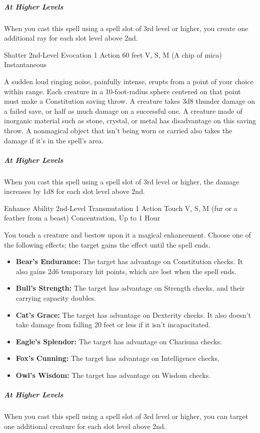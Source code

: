 {\subparagraph*{At Higher Levels} When you cast this spell using a spell slot of 3rd level or higher, you create one additional ray for each slot level above 2nd.

\DndSpellHeader
  {Shatter}
  {2nd-Level Evocation}
  {1 Action}
  {60 feet}
  {V, S, M (A chip of mica)}
  {Instantaneous}
  
A sudden loud ringing noise, painfully intense, erupts from a point of your choice within range. Each creature in a 10-foot-radius sphere centered on that point must make a Constitution saving throw. A creature takes 3d8 thunder damage on a failed save, or half as much damage on a successful one. A creature made of inorganic material such as stone, crystal, or metal has disadvantage on this saving throw. A nonmagical object that isn’t being worn or carried also takes the damage if it’s in the spell’s area.

\subparagraph*{At Higher Levels} When you cast this spell using a spell slot of 3rd level or higher, the damage increases by 1d8 for each slot level above 2nd.

\DndSpellHeader
  {Enhance Ability}
  {2nd-Level Transmutation}
  {1 Action}
  {Touch}
  {V, S, M (fur or a feather from a beast)}
  {Concentration, Up to 1 Hour}
  
You touch a creature and bestow upon it a magical enhancement. Choose one of the following effects; the target gains the effect until the spell ends.
\begin{itemize}
	\item \textbf{Bear's Endurance:} The target has advantage on Constitution checks. It also gains 2d6 temporary hit points, which are lost when the spell ends.
	\item \textbf{Bull's Strength:} The target has advantage on Strength checks, and their carrying capacity doubles.
	\item \textbf{Cat's Grace:} The target has advantage on Dexterity checks. It also doesn’t take damage from falling 20 feet or less if it isn't incapacitated.
	\item \textbf{Eagle's Splendor:} The target has advantage on Charisma checks.
	\item \textbf{Fox's Cunning:} The target has advantage on Intelligence checks.
	\item \textbf{Owl's Wisdom:} The target has advantage on Wisdom checks.
\end{itemize}

\subparagraph*{At Higher Levels} When you cast this spell using a spell slot of 3rd level or higher, you can target one additional creature for each slot level above 2nd.

}

